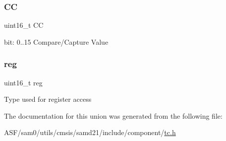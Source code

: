 \subsubsection{\texorpdfstring{CC}{CC}}
{\footnotesize\ttfamily uint16\+\_\+t CC}

bit\+: 0..15 Compare/\+Capture Value \mbox{\label{union_t_c___c_o_u_n_t16___c_c___type_a11760f5020019f4aa8cb02e694f7cc44}} 
\subsubsection{\texorpdfstring{reg}{reg}}
{\footnotesize\ttfamily uint16\+\_\+t reg}

Type used for register access 

The documentation for this union was generated from the following file\+:\begin{DoxyCompactItemize}
\item 
A\+S\+F/sam0/utils/cmsis/samd21/include/component/\mbox{\hyperlink{utils_2cmsis_2samd21_2include_2component_2tc_8h}{tc.\+h}}\end{DoxyCompactItemize}
